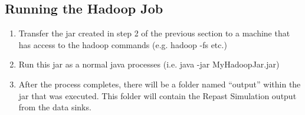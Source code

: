 \documentclass[11pt]{amsart}
\begin{document}
\subsection{Running the Hadoop Job}
\begin{enumerate}
\item Transfer the jar created in step 2 of the previous section to a machine that has access to the hadoop commands (e.g. hadoop -fs etc.)
\item Run this jar as a normal java processes (i.e. java -jar MyHadoopJar.jar)
\item After the process completes, there will be a folder named ``output'' within the jar that was executed. This folder will contain the Repast Simulation output from the data sinks.
\end {enumerate}
\end{document}

